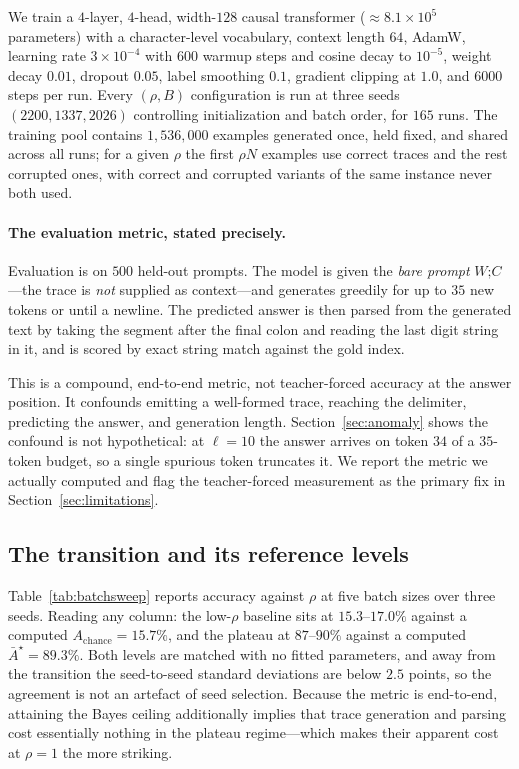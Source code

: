\documentclass{article}
\theoremstyle{plain}
\theoremstyle{definition}
\theoremstyle{remark}
\newcommand{\1}{\mathbf{1}}
\begin{document}
We train a $4$-layer, $4$-head, width-$128$ causal transformer
($\approx8.1\times10^5$ parameters) with a character-level vocabulary, context
length $64$, AdamW, learning rate $3\times10^{-4}$ with $600$ warmup steps and
cosine decay to $10^{-5}$, weight decay $0.01$, dropout $0.05$, label smoothing
$0.1$, gradient clipping at $1.0$, and $6000$ steps per run. Every $(\rho,B)$
configuration is run at three seeds $(2200,1337,2026)$ controlling initialization
and batch order, for $165$ runs. The training pool contains $1{,}536{,}000$
examples generated once, held fixed, and shared across all runs; for a given
$\rho$ the first $\rho N$ examples use correct traces and the rest corrupted
ones, with correct and corrupted variants of the same instance never both used.

\paragraph{The evaluation metric, stated precisely.}
Evaluation is on $500$ held-out prompts. The model is given the \emph{bare
prompt} $W\texttt{;}C$---the trace is \emph{not} supplied as context---and
generates greedily for up to $35$ new tokens or until a newline. The predicted
answer is then parsed from the generated text by taking the segment after the
final colon and reading the last digit string in it, and is scored by exact
string match against the gold index.

This is a compound, end-to-end metric, not teacher-forced accuracy at the answer
position. It confounds emitting a well-formed trace, reaching the delimiter,
predicting the answer, and generation length. Section~\ref{sec:anomaly} shows the
confound is not hypothetical: at $\ell = 10$ the answer arrives on token $34$ of
a $35$-token budget, so a single spurious token truncates it. We report the
metric we actually computed and flag the teacher-forced measurement as the
primary fix in Section~\ref{sec:limitations}.

\subsection{The transition and its reference levels}

Table~\ref{tab:batchsweep} reports accuracy against $\rho$ at five batch sizes
over three seeds. Reading any column: the low-$\rho$ baseline sits at
$15.3$--$17.0\%$ against a computed $A_{\mathrm{chance}} = 15.7\%$, and the
plateau at $87$--$90\%$ against a computed $\bar A^\star = 89.3\%$. Both levels
are matched with no fitted parameters, and away from the transition the
seed-to-seed standard deviations are below $2.5$ points, so the agreement is not
an artefact of seed selection. Because the metric is end-to-end, attaining the
Bayes ceiling additionally implies that trace generation and parsing cost
essentially nothing in the plateau regime---which makes their apparent cost at
$\rho = 1$ the more striking.
\end{document}
